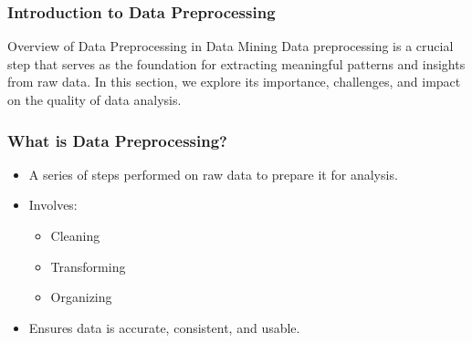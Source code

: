 \documentclass[aspectratio=169]{beamer}
\begin{document}
\frame{\titlepage}

\begin{frame}[fragile]
    \frametitle{Introduction to Data Preprocessing}
    \begin{block}{Overview of Data Preprocessing in Data Mining}
        Data preprocessing is a crucial step that serves as the foundation for extracting meaningful patterns and insights from raw data. 
        In this section, we explore its importance, challenges, and impact on the quality of data analysis.
    \end{block}
\end{frame}

\begin{frame}[fragile]
    \frametitle{What is Data Preprocessing?}
    \begin{itemize}
        \item A series of steps performed on raw data to prepare it for analysis.
        \item Involves:
        \begin{itemize}
            \item Cleaning
            \item Transforming
            \item Organizing
        \end{itemize}
        \item Ensures data is accurate, consistent, and usable.
    \end{itemize}
\end{frame}
\end{document}
